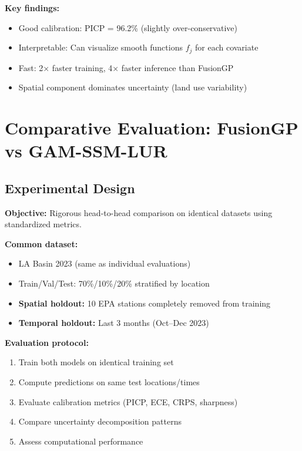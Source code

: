 \documentclass[11pt,letterpaper]{article}
\begin{document}
\textbf{Key findings:}
\begin{itemize}
    \item Good calibration: PICP = 96.2\% (slightly over-conservative)
    \item Interpretable: Can visualize smooth functions $f_j$ for each covariate
    \item Fast: 2× faster training, 4× faster inference than FusionGP
    \item Spatial component dominates uncertainty (land use variability)
\end{itemize}

\section{Comparative Evaluation: FusionGP vs GAM-SSM-LUR} \label{sec:comparison}

\subsection{Experimental Design}

\textbf{Objective:} Rigorous head-to-head comparison on identical datasets using standardized metrics.

\textbf{Common dataset:}
\begin{itemize}
    \item LA Basin 2023 (same as individual evaluations)
    \item Train/Val/Test: 70\%/10\%/20\% stratified by location
    \item \textbf{Spatial holdout:} 10 EPA stations completely removed from training
    \item \textbf{Temporal holdout:} Last 3 months (Oct--Dec 2023)
\end{itemize}

\textbf{Evaluation protocol:}
\begin{enumerate}
    \item Train both models on identical training set
    \item Compute predictions on same test locations/times
    \item Evaluate calibration metrics (PICP, ECE, CRPS, sharpness)
    \item Compare uncertainty decomposition patterns
    \item Assess computational performance
\end{enumerate}
\end{document}
